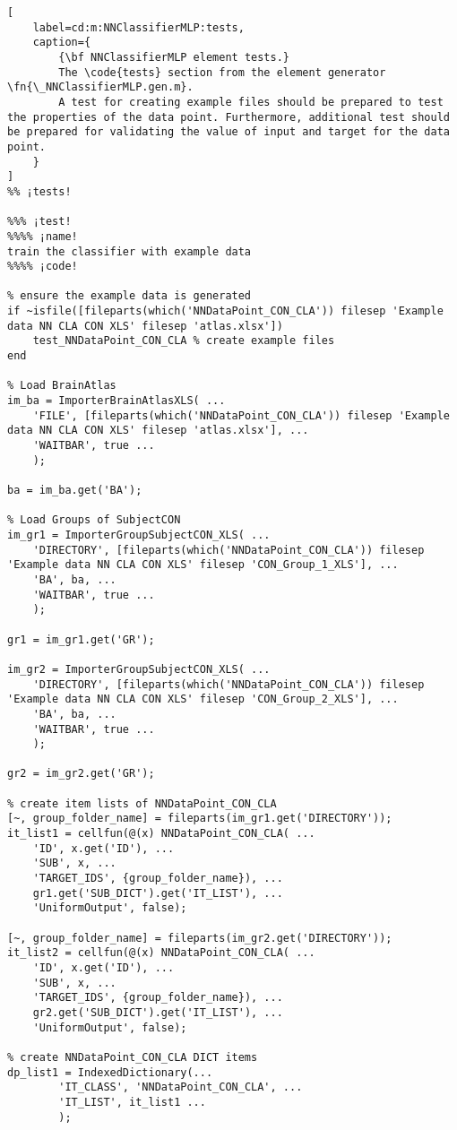 \documentclass{tufte-handout}
\begin{document}
\begin{lstlisting}[
	label=cd:m:NNClassifierMLP:tests,
	caption={
		{\bf NNClassifierMLP element tests.}
		The \code{tests} section from the element generator \fn{\_NNClassifierMLP.gen.m}.
		A test for creating example files should be prepared to test the properties of the data point. Furthermore, additional test should be prepared for validating the value of input and target for the data point.
	}
]			
%% ¡tests!

%%% ¡test!
%%%% ¡name!
train the classifier with example data
%%%% ¡code!

% ensure the example data is generated
if ~isfile([fileparts(which('NNDataPoint_CON_CLA')) filesep 'Example data NN CLA CON XLS' filesep 'atlas.xlsx'])
    test_NNDataPoint_CON_CLA % create example files
end

% Load BrainAtlas
im_ba = ImporterBrainAtlasXLS( ...
    'FILE', [fileparts(which('NNDataPoint_CON_CLA')) filesep 'Example data NN CLA CON XLS' filesep 'atlas.xlsx'], ...
    'WAITBAR', true ...
    );

ba = im_ba.get('BA');

% Load Groups of SubjectCON
im_gr1 = ImporterGroupSubjectCON_XLS( ...
    'DIRECTORY', [fileparts(which('NNDataPoint_CON_CLA')) filesep 'Example data NN CLA CON XLS' filesep 'CON_Group_1_XLS'], ...
    'BA', ba, ...
    'WAITBAR', true ...
    );

gr1 = im_gr1.get('GR');

im_gr2 = ImporterGroupSubjectCON_XLS( ...
    'DIRECTORY', [fileparts(which('NNDataPoint_CON_CLA')) filesep 'Example data NN CLA CON XLS' filesep 'CON_Group_2_XLS'], ...
    'BA', ba, ...
    'WAITBAR', true ...
    );

gr2 = im_gr2.get('GR');

% create item lists of NNDataPoint_CON_CLA
[~, group_folder_name] = fileparts(im_gr1.get('DIRECTORY'));
it_list1 = cellfun(@(x) NNDataPoint_CON_CLA( ...
    'ID', x.get('ID'), ...
    'SUB', x, ...
    'TARGET_IDS', {group_folder_name}), ...
    gr1.get('SUB_DICT').get('IT_LIST'), ...
    'UniformOutput', false);

[~, group_folder_name] = fileparts(im_gr2.get('DIRECTORY'));
it_list2 = cellfun(@(x) NNDataPoint_CON_CLA( ...
    'ID', x.get('ID'), ...
    'SUB', x, ...
    'TARGET_IDS', {group_folder_name}), ...
    gr2.get('SUB_DICT').get('IT_LIST'), ...
    'UniformOutput', false);

% create NNDataPoint_CON_CLA DICT items
dp_list1 = IndexedDictionary(...
        'IT_CLASS', 'NNDataPoint_CON_CLA', ...
        'IT_LIST', it_list1 ...
        );


\end{lstlisting}
\end{document}
